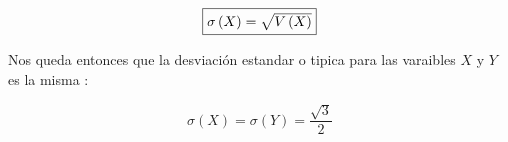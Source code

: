 \documentclass[12pt]{article}
\begin{document}
    \begin{equation*}
        \fbox{$\sigma \left(X\right) = \sqrt{V\left(X\right)} $}
    \end{equation*}

    \begin{flushleft}
        Nos queda entonces que la desviaci\'on estandar o tipica para las varaibles $X$ y $Y$ 
        es la misma :
    \end{flushleft}

    \begin{equation*}
        \displaystyle \sigma \left(X \right) = \sigma\left(Y\right)  = \frac{\sqrt{3}}{2}
    \end{equation*}
\end{document}
